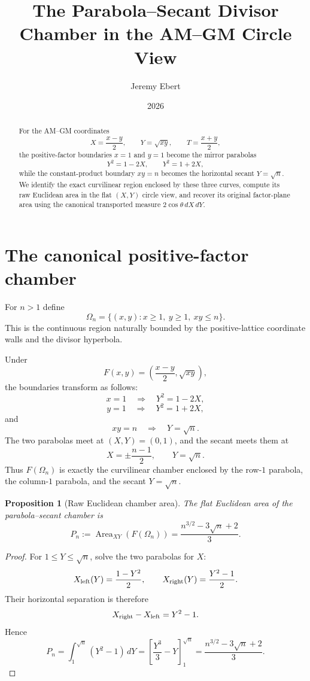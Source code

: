 \documentclass[11pt]{amsart}
\title{The Parabola--Secant Divisor Chamber in the AM--GM Circle View}
\author{Jeremy Ebert}
\date{2026}
\newtheorem{proposition}{Proposition}
\theoremstyle{remark}
\begin{document}
\maketitle

\begin{abstract}
For the AM--GM coordinates
\[
X=\frac{x-y}{2},\qquad Y=\sqrt{xy},\qquad T=\frac{x+y}{2},
\]
the positive-factor boundaries $x=1$ and $y=1$ become the mirror parabolas
\[
Y^2=1-2X,\qquad Y^2=1+2X,
\]
while the constant-product boundary $xy=n$ becomes the horizontal secant $Y=\sqrt n$. We identify the exact curvilinear region enclosed by these three curves, compute its raw Euclidean area in the flat $(X,Y)$ circle view, and recover its original factor-plane area using the canonical transported measure $2\cos\theta\,dX\,dY$.
\end{abstract}

\section{The canonical positive-factor chamber}
For $n>1$ define
\[
\Omega_n=\{(x,y):x\ge1,\ y\ge1,\ xy\le n\}.
\]
This is the continuous region naturally bounded by the positive-lattice coordinate walls and the divisor hyperbola.

Under
\[
F(x,y)=\left(\frac{x-y}{2},\sqrt{xy}\right),
\]
the boundaries transform as follows:
\[
x=1\quad\Longrightarrow\quad Y^2=1-2X,
\]
\[
y=1\quad\Longrightarrow\quad Y^2=1+2X,
\]
and
\[
xy=n\quad\Longrightarrow\quad Y=\sqrt n.
\]
The two parabolas meet at $(X,Y)=(0,1)$, and the secant meets them at
\[
X=\pm\frac{n-1}{2},\qquad Y=\sqrt n.
\]
Thus $F(\Omega_n)$ is exactly the curvilinear chamber enclosed by the row-$1$ parabola, the column-$1$ parabola, and the secant $Y=\sqrt n$.

\begin{proposition}[Raw Euclidean chamber area]\label{prop:rawchamber}
The flat Euclidean area of the parabola--secant chamber is
\[
\boxed{
P_n:=\operatorname{Area}_{XY}(F(\Omega_n))
=\frac{n^{3/2}-3\sqrt n+2}{3}.}
\]
\end{proposition}

\begin{proof}
For $1\le Y\le\sqrt n$, solve the two parabolas for $X$:
\[
X_{\rm left}(Y)=\frac{1-Y^2}{2},\qquad
X_{\rm right}(Y)=\frac{Y^2-1}{2}.
\]
Their horizontal separation is therefore
\[
X_{\rm right}-X_{\rm left}=Y^2-1.
\]
Hence
\[
P_n=\int_1^{\sqrt n}(Y^2-1)\,dY
=\left[\frac{Y^3}{3}-Y\right]_1^{\sqrt n}
=\frac{n^{3/2}-3\sqrt n+2}{3}.
\]
\end{proof}
\end{document}
